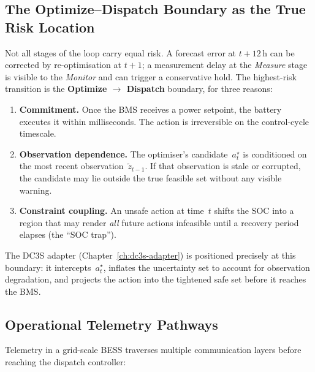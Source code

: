 \subsection{The Optimize--Dispatch Boundary as the True Risk Location}

Not all stages of the loop carry equal risk.  A forecast error at
$t + 12$\,h can be corrected by re-optimisation at $t + 1$; a measurement
delay at the \emph{Measure} stage is visible to the \emph{Monitor} and can
trigger a conservative hold.  The highest-risk transition is the
\textbf{Optimize $\to$ Dispatch} boundary, for three reasons:

\begin{enumerate}
  \item \textbf{Commitment.}  Once the BMS receives a power setpoint, the
    battery executes it within milliseconds.  The action is irreversible on the
    control-cycle timescale.
  \item \textbf{Observation dependence.}  The optimiser's candidate~$a_t^\star$
    is conditioned on the most recent observation~$\tilde{z}_{t-1}$.  If that
    observation is stale or corrupted, the candidate may lie outside the true
    feasible set without any visible warning.
  \item \textbf{Constraint coupling.}  An unsafe action at time~$t$ shifts the
    SOC into a region that may render \emph{all} future actions infeasible
    until a recovery period elapses (the ``SOC trap'').
\end{enumerate}

The DC3S adapter (Chapter~\ref{ch:dc3s-adapter}) is positioned precisely at
this boundary: it intercepts~$a_t^\star$, inflates the uncertainty set to
account for observation degradation, and projects the action into the
tightened safe set before it reaches the BMS.

\subsection{Operational Telemetry Pathways}

Telemetry in a grid-scale BESS traverses multiple communication layers before
reaching the dispatch controller:

